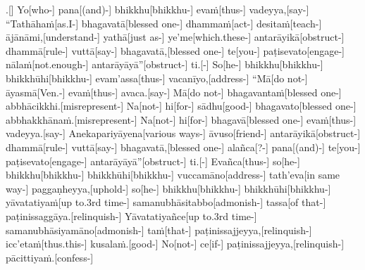 \documentclass[12pt]{article}
\begin{document}
\begin{paracol}{2}
\begin{column}
\begin{flushleft}
.[] Yo[who-] pana[(and)-] bhikkhu[bhikkhu-] evaṁ[thus-] vadeyya,[say-] “Tathāhaṁ[as.I-] bhagavatā[blessed one-] dhammaṁ[act-] desitaṁ[teach-] ājānāmi,[understand-] yathā[just as-] ye’me[which.these-\NUL{\GMU{}}] antarāyikā[obstruct-] dhammā[rule-] vuttā[say-] bhagavatā,[blessed one-] te[you-] paṭisevato[engage-] nālaṁ[not.enough-] antarāyāyā”[obstruct-] ti.[-\NUL{\GMU{}}] So[he-] bhikkhu[bhikkhu-] bhikkhūhi[bhikkhu-] evam’assa[thus-] vacanīyo,[address-] “Mā[do not-] āyasmā[Ven.-] evaṁ[thus-] avaca.[say-\NUL{\GMU{}}] Mā[do not-] bhagavantaṁ[blessed one-] abbhācikkhi.[misrepresent-] Na[not-] hi[for-] sādhu[good-] bhagavato[blessed one-] abbhakkhānaṁ.[misrepresent-\NUL{\GMU{}}] Na[not-] hi[for-] bhagavā[blessed one-] evaṁ[thus-] vadeyya.[say-] Anekapariyāyena[various ways-] āvuso[friend-] antarāyikā[obstruct-] dhammā[rule-] vuttā[say-] bhagavatā,[blessed one-] alañca[?-\NUL{\GMU{}}] pana[(and)-] te[you-] paṭisevato[engage-] antarāyāyā”[obstruct-] ti.[-\NUL{\GMU{}}] Evañca[thus-] so[he-] bhikkhu[bhikkhu-] bhikkhūhi[bhikkhu-] vuccamāno[address-] tath’eva[in same way-\NUL{\GMU{}}] paggaṇheyya,[uphold-] so[he-] bhikkhu[bhikkhu-] bhikkhūhi[bhikkhu-] yāvatatiyaṁ[up to.3rd time-] samanubhāsitabbo[admonish-] tassa[of that-] paṭinissaggāya.[relinquish-] Yāvatatiyañce[up to.3rd time-] samanubhāsiyamāno[admonish-] taṁ[that-] paṭinissajjeyya,[relinquish-] icc’etaṁ[thus.this-] kusalaṁ.[good-] No[not-] ce[if-\NUL{\GMU{}}] paṭinissajjeyya,[relinquish-] pācittiyaṁ.[confess-]
\endgl
\switchcolumn*
\end{flushleft}



\end{column}
\end{paracol}
\end{document}
